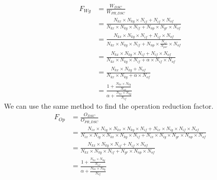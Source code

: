 \begin{align*}
    F_{Wg} &= \frac{W_{DSC}}{W_{PR\_DSC}} \\
           &= \frac{N_{kx} \times N_{ky} \times N_{if} + N_{if} \times N_{of}}{N_{kx} \times N_{ky} \times N_{if} + N_{np} \times N_{gr} \times N_{of}}\\
           &= \frac{N_{kx} \times N_{ky} \times N_{if} + N_{if} \times N_{of}}{N_{kx} \times N_{ky} \times N_{if} + N_{np} \times \frac{N_{if}}{N_{par}} \times N_{of}}\\
           &= \frac{N_{kx} \times N_{ky} \times N_{if} + N_{if} \times N_{of}}{N_{kx} \times N_{ky} \times N_{if} + \alpha \times N_{if} \times N_{of}}\\
           &= \frac{N_{kx} \times N_{ky} + N_{of}}{N_{kx} \times N_{ky} + \alpha \times N_{of}}\\
           &= \frac{1 + \frac{N_{kx} \times N_{ky}} {N_{of}}} {\alpha + \frac{N_{kx} \times N_{ky}} {N_{of}}}
\end{align*}
%
We can use the same method to find the operation reduction factor.
%
\begin{align*}
    F_{Op} &= \frac{O_{DSC}}{O_{PR\_DSC}} \\
           &= \frac{N_{ix} \times N_{iy} \times N_{kx} \times N_{ky} \times N_{if} + N_{ix} \times N_{iy} \times N_{if} \times N_{of}}{N_{ix} \times N_{iy} \times N_{kx} \times N_{ky} \times N_{if} + N_{ix} \times N_{iy} \times N_{gr} \times N_{np} \times N_{of}}\\
           &= \frac{N_{kx} \times N_{ky} \times N_{if} + N_{if} \times N_{of}}{N_{kx} \times N_{ky} \times N_{if} + N_{gr} \times N_{np} \times N_{of}}\\
           &= \frac{1 + \frac{N_{kx} \times N_{ky}} {N_{of}}} {\alpha + \frac{N_{kx} \times N_{ky}} {N_{of}}}
\end{align*}
%
\newpage